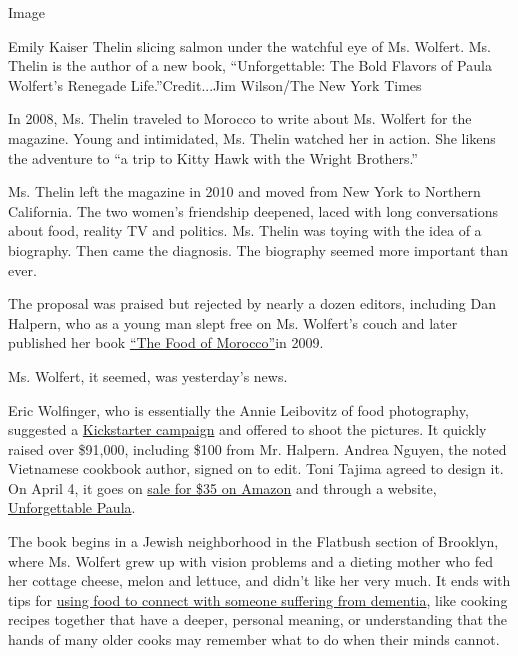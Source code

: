Image

Emily Kaiser Thelin slicing salmon under the watchful eye of Ms.
Wolfert. Ms. Thelin is the author of a new book, ``Unforgettable: The
Bold Flavors of Paula Wolfert's Renegade Life.''Credit...Jim Wilson/The
New York Times

In 2008, Ms. Thelin traveled to Morocco to write about Ms. Wolfert for
the magazine. Young and intimidated, Ms. Thelin watched her in action.
She likens the adventure to ``a trip to Kitty Hawk with the Wright
Brothers.''

Ms. Thelin left the magazine in 2010 and moved from New York to Northern
California. The two women's friendship deepened, laced with long
conversations about food, reality TV and politics. Ms. Thelin was toying
with the idea of a biography. Then came the diagnosis. The biography
seemed more important than ever.

The proposal was praised but rejected by nearly a dozen editors,
including Dan Halpern, who as a young man slept free on Ms. Wolfert's
couch and later published her book
\href{https://www.harpercollins.com/9780061957550/the-food-of-morocco}{``The
Food of Morocco''}in 2009.

Ms. Wolfert, it seemed, was yesterday's news.

Eric Wolfinger, who is essentially the Annie Leibovitz of food
photography, suggested a
\href{https://www.kickstarter.com/projects/265444901/unforgettable-bold-flavors-from-a-renegade-life}{Kickstarter
campaign} and offered to shoot the pictures. It quickly raised over
\$91,000, including \$100 from Mr. Halpern. Andrea Nguyen, the noted
Vietnamese cookbook author, signed on to edit. Toni Tajima agreed to
design it. On April 4, it goes on
\href{https://www.amazon.com/Unforgettable-Flavors-Paula-Wolferts-Renegade/dp/1681882221/ref=la_B06XQXCSQW_1_1?s=books\&ie=UTF8\&qid=1490110907\&sr=1-1}{sale
for \$35 on Amazon} and through a website,
\href{http://www.unforgettablepaula.com/}{Unforgettable Paula}.

The book begins in a Jewish neighborhood in the Flatbush section of
Brooklyn, where Ms. Wolfert grew up with vision problems and a dieting
mother who fed her cottage cheese, melon and lettuce, and didn't like
her very much. It ends with tips for
\href{http://www.pbs.org/newshour/bb/health-july-dec13-wolfert_11-26/}{using
food to connect with someone suffering from dementia}, like cooking
recipes together that have a deeper, personal meaning, or understanding
that the hands of many older cooks may remember what to do when their
minds cannot.

